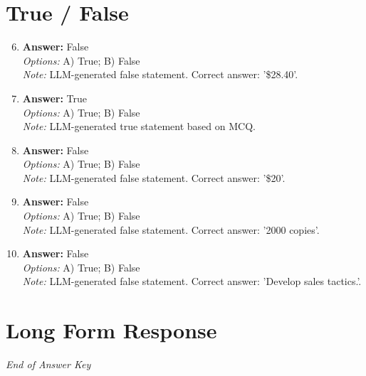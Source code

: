 \documentclass[12pt]{article}
\begin{document}
\section*{True / False}
\begin{enumerate}[label=\arabic*.]
\setcounter{enumi}{5}
\item \textbf{Answer:} False
\\ \textit{Options:} A) True; B) False
\\ \textit{Note:} LLM-generated false statement. Correct answer: '\$28.40'.
\item \textbf{Answer:} True
\\ \textit{Options:} A) True; B) False
\\ \textit{Note:} LLM-generated true statement based on MCQ.
\item \textbf{Answer:} False
\\ \textit{Options:} A) True; B) False
\\ \textit{Note:} LLM-generated false statement. Correct answer: '\$20'.
\item \textbf{Answer:} False
\\ \textit{Options:} A) True; B) False
\\ \textit{Note:} LLM-generated false statement. Correct answer: '2000 copies'.
\item \textbf{Answer:} False
\\ \textit{Options:} A) True; B) False
\\ \textit{Note:} LLM-generated false statement. Correct answer: 'Develop sales tactics.'.
\end{enumerate}

\section*{Long Form Response}

\vfill
\noindent\textit{End of Answer Key}
\end{document}
